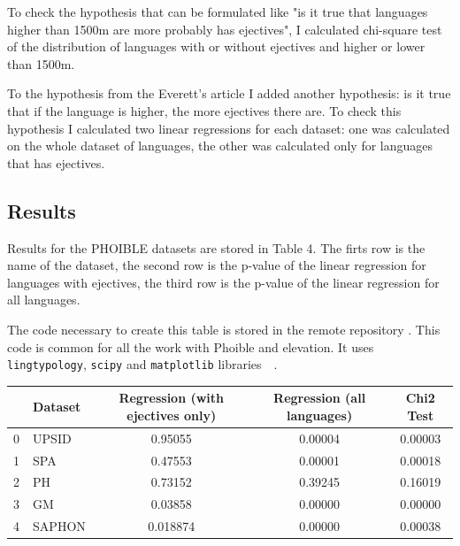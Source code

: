 \documentclass[a4paper,12pt]{article}
\begin{document}
To check the hypothesis that can be formulated like "is it true that languages higher than 1500m are more probably has ejectives", I calculated chi-square test of the distribution of languages with or without ejectives and higher or lower than 1500m.

To the hypothesis from the Everett's article I added another hypothesis: is it true that if the language is higher, the more ejectives there are. To check this hypothesis I calculated two linear regressions for each dataset: one was calculated on the whole dataset of languages, the other was calculated only for languages that has ejectives.

\subsection{Results}

Results for the PHOIBLE datasets are stored in Table 4. The firts row is the name of the dataset, the second row is the p-value of the linear regression for languages with ejectives, the third row is the p-value of the linear regression for all languages.

The code necessary to create this table is stored in the remote repository \parencite[PHOIBLE: Quantitative Research.ipynb]{lingtypologyResearch}. This code is common 
for all the work with Phoible and elevation. It uses \texttt{lingtypology}, \texttt{scipy} and \texttt{matplotlib} libraries~\parencite{scipy}~\parencite{matplotlib}.

\noindent
\begin{minipage}{\textwidth}
\begin{adjustbox}{max width=\textwidth}
\begin{tabular}{ l | l | c | c | c }
    ~  & Dataset  & Regression (with ejectives only)  & Regression (all languages)  & Chi2 Test \\
    \hline
    0  & UPSID  & 0.95055  & 0.00004  & 0.00003 \\
    1  & SPA  & 0.47553  & 0.00001  & 0.00018 \\
    2  & PH  & 0.73152  & 0.39245  & 0.16019 \\
    3  & GM  & 0.03858  & 0.00000  & 0.00000 \\
    4  & SAPHON  & 0.018874  & 0.00000  & 0.00038 \\
    \hline
\end{tabular}
\end{adjustbox}
\end{minipage}
\bigskip
\end{document}
